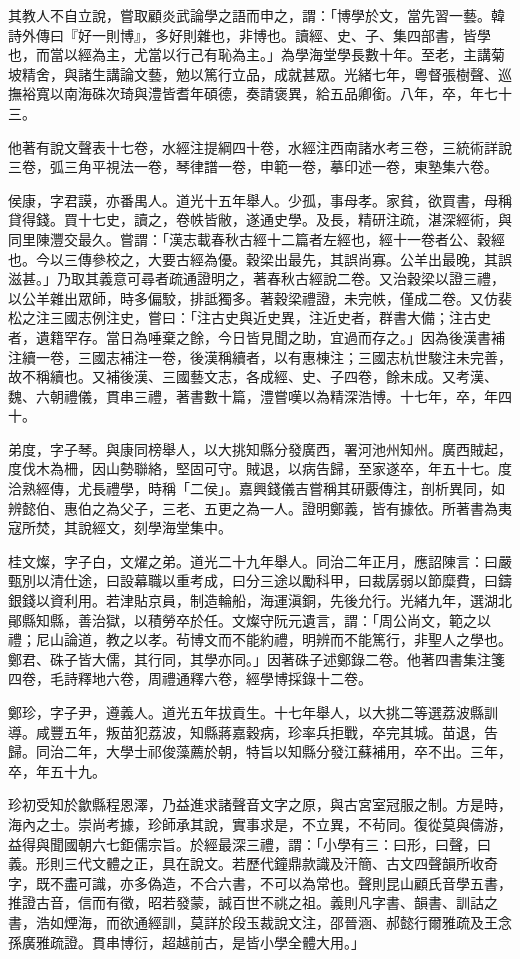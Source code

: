 \begin{pinyinscope}
其教人不自立說，嘗取顧炎武論學之語而申之，謂：「博學於文，當先習一藝。韓詩外傳曰『好一則博』，多好則雜也，非博也。讀經、史、子、集四部書，皆學也，而當以經為主，尤當以行己有恥為主。」為學海堂學長數十年。至老，主講菊坡精舍，與諸生講論文藝，勉以篤行立品，成就甚眾。光緒七年，粵督張樹聲、巡撫裕寬以南海硃次琦與澧皆耆年碩德，奏請褒異，給五品卿銜。八年，卒，年七十三。

他著有說文聲表十七卷，水經注提綱四十卷，水經注西南諸水考三卷，三統術詳說三卷，弧三角平視法一卷，琴律譜一卷，申範一卷，摹印述一卷，東塾集六卷。

侯康，字君謨，亦番禺人。道光十五年舉人。少孤，事母孝。家貧，欲買書，母稱貸得錢。買十七史，讀之，卷帙皆敝，遂通史學。及長，精研注疏，湛深經術，與同里陳灃交最久。嘗謂：「漢志載春秋古經十二篇者左經也，經十一卷者公、穀經也。今以三傳參校之，大要古經為優。穀梁出最先，其誤尚寡。公羊出最晚，其誤滋甚。」乃取其義意可尋者疏通證明之，著春秋古經說二卷。又治穀梁以證三禮，以公羊雜出眾師，時多偏駮，排詆獨多。著穀梁禮證，未完帙，僅成二卷。又仿裴松之注三國志例注史，嘗曰：「注古史與近史異，注近史者，群書大備；注古史者，遺籍罕存。當日為唾棄之餘，今日皆見聞之助，宜過而存之。」因為後漢書補注續一卷，三國志補注一卷，後漢稱續者，以有惠棟注；三國志杭世駿注未完善，故不稱續也。又補後漢、三國藝文志，各成經、史、子四卷，餘未成。又考漢、魏、六朝禮儀，貫串三禮，著書數十篇，澧嘗嘆以為精深浩博。十七年，卒，年四十。

弟度，字子琴。與康同榜舉人，以大挑知縣分發廣西，署河池州知州。廣西賊起，度伐木為柵，因山勢聯絡，堅固可守。賊退，以病告歸，至家遂卒，年五十七。度洽熟經傳，尤長禮學，時稱「二侯」。嘉興錢儀吉嘗稱其研覈傳注，剖析異同，如辨懿伯、惠伯之為父子，三老、五更之為一人。證明鄭義，皆有據依。所著書為夷寇所焚，其說經文，刻學海堂集中。

桂文燦，字子白，文燿之弟。道光二十九年舉人。同治二年正月，應詔陳言：曰嚴甄別以清仕途，曰設幕職以重考成，曰分三途以勵科甲，曰裁孱弱以節糜費，曰鑄銀錢以資利用。若津貼京員，制造輪船，海運滇銅，先後允行。光緒九年，選湖北鄖縣知縣，善治獄，以積勞卒於任。文燦守阮元遺言，謂：「周公尚文，範之以禮；尼山論道，教之以孝。茍博文而不能約禮，明辨而不能篤行，非聖人之學也。鄭君、硃子皆大儒，其行同，其學亦同。」因著硃子述鄭錄二卷。他著四書集注箋四卷，毛詩釋地六卷，周禮通釋六卷，經學博採錄十二卷。

鄭珍，字子尹，遵義人。道光五年拔貢生。十七年舉人，以大挑二等選荔波縣訓導。咸豐五年，叛苗犯荔波，知縣蔣嘉穀病，珍率兵拒戰，卒完其城。苗退，告歸。同治二年，大學士祁俊藻薦於朝，特旨以知縣分發江蘇補用，卒不出。三年，卒，年五十九。

珍初受知於歙縣程恩澤，乃益進求諸聲音文字之原，與古宮室冠服之制。方是時，海內之士。崇尚考據，珍師承其說，實事求是，不立異，不茍同。復從莫與儔游，益得與聞國朝六七鉅儒宗旨。於經最深三禮，謂：「小學有三：曰形，曰聲，曰義。形則三代文體之正，具在說文。若歷代鐘鼎款識及汗簡、古文四聲韻所收奇字，既不盡可識，亦多偽造，不合六書，不可以為常也。聲則昆山顧氏音學五書，推證古音，信而有徵，昭若發蒙，誠百世不祧之祖。義則凡字書、韻書、訓詁之書，浩如煙海，而欲通經訓，莫詳於段玉裁說文注，邵晉涵、郝懿行爾雅疏及王念孫廣雅疏證。貫串博衍，超越前古，是皆小學全體大用。」


\end{pinyinscope}
